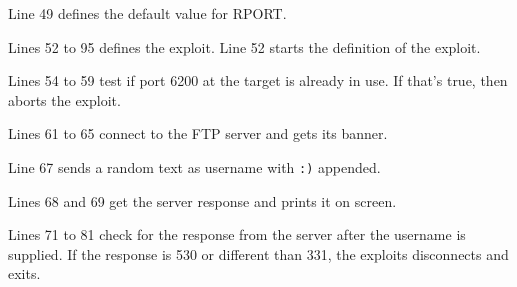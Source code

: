 \begin{listingbox}
    
\end{listingbox}

Line 49 defines the default value for RPORT.

\begin{listingbox}
    
\end{listingbox}

Lines 52 to 95 defines the exploit. Line 52 starts the definition of the exploit. 

\begin{listingbox}
    
\end{listingbox}

Lines 54 to 59 test if port 6200 at the target is already in use. If that's true, then aborts the exploit.

\begin{listingbox}
    
\end{listingbox}

Lines 61 to 65 connect to the FTP server and gets its banner.

\begin{listingbox}
    
\end{listingbox}

Line 67 sends a random text as username with \texttt{:)} appended. 

\begin{listingbox}
    
\end{listingbox}

Lines 68 and 69 get the server response and prints it on screen. 

\begin{listingbox}
    
\end{listingbox}

Lines 71 to 81 check for the response from the server after the username is supplied. If the response is 530 or different than 331, the exploits disconnects and exits.

